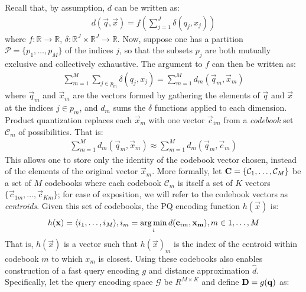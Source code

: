 Recall that, by assumption, $d$ can be written as:
\begin{align*}
        d(\vec{q}, \vec{x}) = f(\sum_{j=1}^J \delta(q_j, x_j))
\end{align*}
where $f: \mathbb{R} \rightarrow \mathbb{R}$, $\delta: \mathbb{R}^J \times \mathbb{R}^J \rightarrow \mathbb{R}$. Now, suppose one has a partition $\mathcal{P} = \{p_1,\ldots,p_M \}$ of the indices $j$, so that the subsets $p_j$ are both mutually exclusive and collectively exhaustive. %
The argument to $f$ can then be written as:
\begin{align}
        \sum_{m=1}^M \sum_{j \in p_m} \delta(q_j, x_j)
            = \sum_{m=1}^M d_m(\vec{q}_m, \vec{x}_m)
\end{align}
where $\vec{q}_m$ and $\vec{x}_m$ are the vectors formed by gathering the elements of $\vec{q}$ and $\vec{x}$ at the indices $j \in p_m$, and $d_m$ sums the $\delta$ functions applied to each dimension. Product quantization replaces each $\vec{x}_m$ with one vector $\vec{c}_{im}$ from a \textit{codebook} set $\mathcal{C}_m$ of possibilities. That is: %
\begin{align} \label{eq:pqDistNoLut}
        \sum_{m=1}^M d_m(\vec{q}_m, \vec{x}_m) \approx \sum_{m=1}^M d_m(\vec{q}_m, \vec{c}_{m})
\end{align}
This allows one to store only the identity of the codebook vector chosen, instead of the elements of the original vector $\vec{x}_m$. More formally, let $\mathcal{\mathbf{C}} = \{\mathcal{C}_1,\ldots,\mathcal{C}_M\}$ be a set of $M$ codebooks where each codebook $\mathcal{C}_m $ is itself a set of $K$ vectors $\{\vec{c}_{1m},\ldots,\vec{c}_{Km}\}$; for ease of exposition, we will refer to the codebook vectors as \textit{centroids}. Given this set of codebooks, the PQ encoding function $h(\vec{x})$ is:
\begin{align}
    h(\mathbf{x}) = \langle i_1,\ldots,i_M \rangle,  i_m = \operatorname*{arg\,min}_i d(\mathbf{c}_{im}, \mathbf{x_m}), m \in {1,\ldots,M}
\end{align}
That is, $h(\vec{x})$ is a vector such that $h(\vec{x})_m$ is the index of the centroid within codebook $m$ to which $x_m$ is closest. Using these codebooks also enables construction of a fast query encoding $g$ and distance approximation $\hat{d}$. Specifically, let the query encoding space $\mathcal{G}$ be $R^{M \times K}$ and define $\mathbf{D} = g(\mathbf{q})$ as: %
